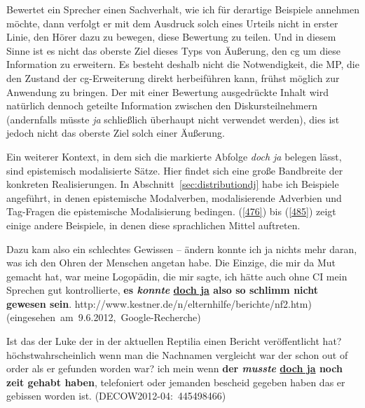 Bewertet ein Sprecher einen Sachverhalt, wie ich für derartige Beispiele annehmen möchte, dann verfolgt er mit dem Ausdruck solch eines Urteils nicht in erster Linie, den Hörer dazu zu bewegen, diese Bewertung zu teilen. Und in diesem Sinne ist es nicht das oberste Ziel dieses Typs von Äußerung, den cg um diese Information zu erweitern. Es besteht deshalb nicht die Notwendigkeit, die MP, die den Zustand der cg-Erweiterung direkt herbeiführen kann, frühst möglich zur Anwendung zu bringen. Der mit einer Bewertung  ausgedrückte Inhalt wird natürlich dennoch geteilte Information zwischen den Diskursteilnehmern (andernfalls müsste \textit{ja} schließlich überhaupt nicht verwendet werden), dies ist jedoch nicht das oberste Ziel solch einer Äußerung.

Ein weiterer Kontext, in dem sich die markierte Abfolge \textit{doch ja} belegen lässt, sind epistemisch  modalisierte Sätze. Hier findet sich eine große Bandbreite der konkreten Realisierungen. In Abschnitt~\ref{sec:distributiondj} habe ich Beispiele angeführt, in denen  epistemische Modalverben, modalisierende Adverbien  und Tag-Fragen  die epistemische Modalisierung bedingen. (\ref{476}) bis (\ref{485}) zeigt einige andere Beispiele, in denen diese sprachlichen Mittel auftreten.

\begin{exe}
	\ex\label{476} 
	\scriptsize
	Dazu kam also ein schlechtes Gewissen – ändern konnte ich ja nichts mehr daran, was ich den Ohren der Menschen \glqq angetan\grqq{} habe. Die Einzige, 	die mir da Mut gemacht hat, war meine Logopädin, die mir sagte, ich hätte auch ohne CI mein Sprechen gut kontrollierte, \textbf{es \textit{konnte} 			\underline{doch ja} also so schlimm nicht gewesen sein}. 	
	\hfill\hbox{http://www.kestner.de/n/elternhilfe/berichte/nf2.htm)}	
	\newline		
	\hbox{}\hfill\hbox{(eingesehen am 9.6.2012, Google-Recherche)}	
	\newline		
	\hbox{}\hfill\hbox{\citet[228]{Mueller2017b}}
\end{exe} 

\begin{exe}
	\ex\label{477} 
	\scriptsize
	Ist das der Luke der in der aktuellen Reptilia einen Bericht veröffentlicht hat? höchstwahrscheinlich wenn man die Nachnamen vergleicht war der schon 		out of order als er gefunden worden war? ich mein wenn \textbf{der \textit{musste} \underline{doch ja} noch zeit gehabt haben}, telefoniert oder 			jemanden bescheid gegeben haben das er gebissen worden ist. 	
	\hfill\hbox{(DECOW2012-04: 445498466)}	
\end{exe}

